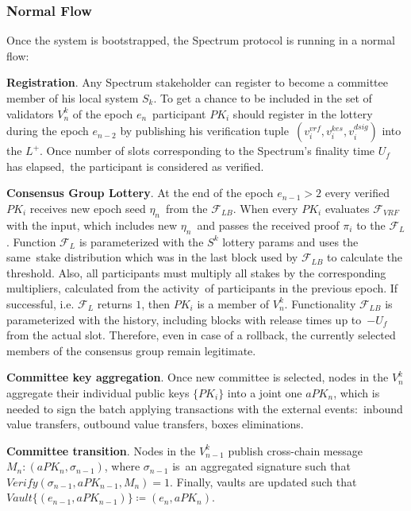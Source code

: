 \subsubsection{Normal Flow}\label{subsubsec:normal-flow}
Once the system is bootstrapped, the Spectrum protocol is running in a normal flow:
\begin{legal}
    \item \textbf{Registration}.
    Any Spectrum stakeholder can register to become a committee member of his local system $S_k$.
    To get a chance to be included in the set of validators $V^k_n$ of the epoch $e_n$\
    participant $PK_i$ should register in the lottery during the epoch $e_{n-2}$ by publishing his verification tuple\
    ${(v_i^{vrf}, v_i^{kes}, v_i^{dsig})}$ into the $L^+$.
    Once number of slots corresponding to the Spectrum's finality time $U_f$ has elapsed,\
    the participant is considered as verified.

    \item \textbf{Consensus Group Lottery}.
    At the end of the epoch ${e_{n-1} \gt 2}$ every verified $PK_i$ receives new epoch seed $\eta_n$\
    from the ${\mathcal{F}}_{LB}$.
    When every $PK_i$ evaluates ${\mathcal{F}}_{VRF}$ with the input, which includes new $\eta_n$\
    and passes the received proof $\pi_i$ to the ${\mathcal{F}}_{L}$.
    Function ${\mathcal{F}}_{L}$ is parameterized with the $S^k$ lottery params and uses the same\
    stake distribution which was in the last block used by ${\mathcal{F}}_{LB}$ to calculate the threshold.
    Also, all participants must multiply all stakes by the corresponding multipliers, calculated from the activity\
    of participants in the previous epoch.
    If successful, i.e. ${\mathcal{F}}_{L}$ returns $1$, then $PK_i$ is a member of $V^k_n$.
    Functionality ${\mathcal{F}}_{LB}$ is parameterized with the history, including blocks with release times up to\
    ${-U_f}$ from the actual slot.
    Therefore, even in case of a rollback, the currently selected members of the consensus group remain legitimate.

    \item \textbf{Committee key aggregation}.
    Once new committee is selected, nodes in the $V^k_n$ aggregate their individual public keys $\{PK_i\}$ into
    a joint one $aPK_n$, which is needed to sign the batch applying transactions with the external events:\
    inbound value transfers, outbound value transfers, boxes eliminations.

    \item \textbf{Committee transition}.
    Nodes in the $V^k_{n - 1}$ publish cross-chain message ${M_n : (aPK_n, \sigma_{n-1})}$, where $\sigma_{n-1}$ is\
    an aggregated signature such that ${Verify(\sigma_{n-1}, aPK_{n-1}, M_n) = 1}$.
    Finally, vaults are updated such that ${Vault\{(e_{n-1}, aPK_{n-1})\} \coloneqq(e_n, aPK_n)}$.


\end{legal}

